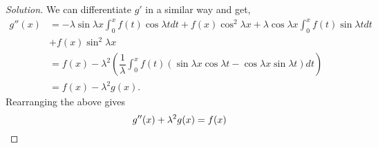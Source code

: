 \documentclass[12pt]{article}
\theoremstyle{definition}
\newenvironment{soln}{\begin{proof}[Solution]}{\end{proof}}
\begin{document}
\begin{itemize}
\begin{soln}
		We can differentiate $g'$ in a similar way and get,
		\begin{align*}
			g''(x) &= -\lambda\sin\lambda x\int_{0}^{x} f(t)\cos \lambda t dt + f(x)\cos^2\lambda x + \lambda \cos \lambda x \int_{0}^{x} f(t)\sin \lambda t dt \\
			& + f(x)\sin^2 \lambda x\\
			&= f(x) - \lambda^2\left(\dfrac{1}{\lambda}\int_{0}^{x} f(t) \left(\sin \lambda x\cos \lambda t - \cos \lambda x \sin \lambda t\right) dt\right)\\
			&= f(x) - \lambda^2g(x).
		\end{align*}
		Rearranging the above gives
		\begin{equation*} 
			g''(x) + \lambda^2g(x) = f(x) \qedhere
		\end{equation*}
	\end{soln}
\end{itemize}
\end{document}
